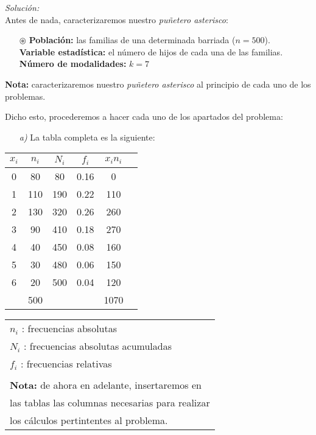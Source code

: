 \documentclass[11pt,a4paper]{article}
\theoremstyle{definition}
\begin{document}
\emph{Solución:} \\

Antes de nada, caracterizaremos nuestro \emph{puñetero asterisco}:

\begin{itemize}
	\item[$\circledast$] \textbf{Población:} las familias de una determinada barriada ($n=500$). \\ \textbf{Variable estadística:} el número de hijos de cada una de las familias. \\ \textbf{Número de modalidades:} $k=7$
\end{itemize}

\small{\textbf{Nota:} caracterizaremos nuestro \emph{puñetero asterisco} al principio de cada uno de los problemas.}

\pagebreak

Dicho esto, procederemos a hacer cada uno de los apartados del problema:

\begin{itemize}
	\item[\emph{a)}] La tabla completa es la siguiente:
\end{itemize}



\begin{table}[!htbp]
\hspace*{2 cm}
\begin{tabular}{|c|c|c|c|c|c|}
$x_i$ & $n_i$ & $N_i$ & $f_i$ & $x_in_i$ \\ \hline
0 & 80 & 80 & 0.16 & 0 \\
1 & 110 & 190 & 0.22 & 110 \\
2 & 130 & 320 & 0.26 & 260  \\
3 & 90 & 410 & 0.18 & 270\\
4 & 40 & 450 & 0.08 & 160 \\
5 & 30 & 480 & 0.06 & 150\\
6 & 20 & 500 & 0.04 & 120 \\ \hline
\multicolumn{1}{c}{} & \multicolumn{1}{|c|}{500} & \multicolumn{1}{c}{} & \multicolumn{1}{c}{} & \multicolumn{1}{|c|}{1070} \\ \cline{2-2} \cline{5-5}
\end{tabular}
\hspace*{1cm}
{
\begin{tabular}{l}
$n_i$ : frecuencias absolutas \\
$N_i$ : frecuencias absolutas acumuladas \\
$f_i$ : frecuencias relativas \\
\\
\small{\textbf{Nota:} de ahora en adelante, insertaremos en} \\
\small{las tablas las columnas necesarias para realizar} \\
\small{los cálculos pertintentes al problema.}
\end{tabular}}

\end{table}
\end{document}
